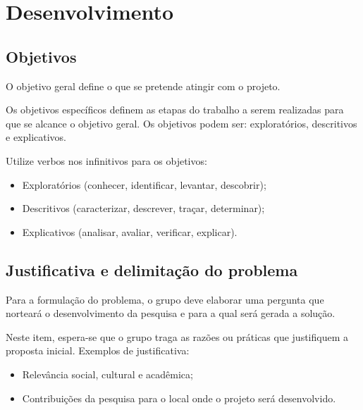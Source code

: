 \chapter{Desenvolvimento}\label{cap:desenvolvimento}

\section{Objetivos}\label{sec:objetivos}

O objetivo geral define o que se pretende atingir com o projeto.

Os objetivos específicos definem as etapas do trabalho a serem realizadas
para que se alcance o objetivo geral. Os objetivos podem ser: exploratórios,
descritivos e explicativos.

Utilize verbos nos infinitivos para os objetivos:

\begin{itemize}
    \item Exploratórios (conhecer, identificar, levantar, descobrir);
    \item Descritivos (caracterizar, descrever, traçar, determinar);
    \item Explicativos (analisar, avaliar, verificar, explicar).
\end{itemize}

\section{Justificativa e delimitação do problema}\label{sec:justificativa}

Para a formulação do problema, o grupo deve elaborar uma pergunta que
norteará o desenvolvimento da pesquisa e para a qual será gerada a solução.

Neste item, espera-se que o grupo traga as razões ou práticas que
justifiquem a proposta inicial. Exemplos de justificativa:

\begin{itemize}
    \item Relevância social, cultural e acadêmica;
    \item Contribuições da pesquisa para o local onde o projeto será
          desenvolvido.
\end{itemize}

